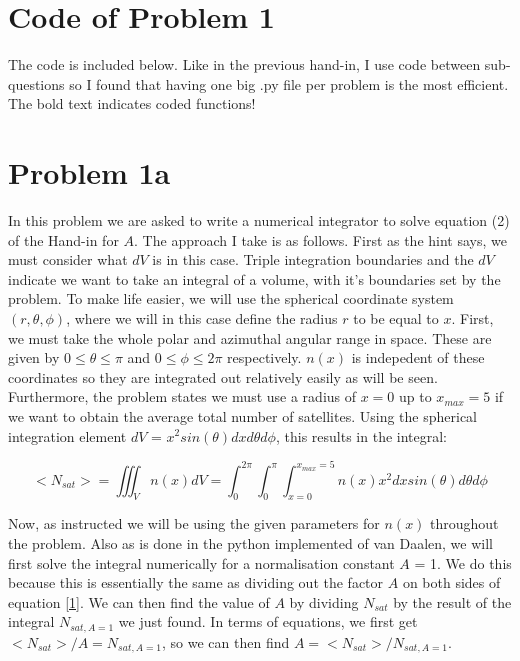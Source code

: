 \section*{Code of Problem 1}

The code is included below. Like in the previous hand-in, I use code between sub-questions so I found that having one big .py file per problem is the most efficient. The bold text indicates coded functions! 



\section*{Problem 1a}

In this problem we are asked to write a numerical integrator to solve equation (2) of the Hand-in for $A$. The approach I take is as follows. First as the hint says, we must consider what $dV$ is in this case. Triple integration boundaries and the $dV$ indicate we want to take an integral of a volume, with it's boundaries set by the problem. To make life easier, we will use the spherical coordinate system $(r,\theta,\phi)$, where we will in this case define the radius $r$ to be equal to $x$. First, we must take the whole polar and azimuthal angular range in space. These are given by $0 \le \theta \le \pi$ and $0 \le \phi \le 2\pi$ respectively. $n(x)$ is indepedent of these coordinates so they are integrated out relatively easily as will be seen. Furthermore, the problem states we must use a radius of $x = 0$ up to $x_{max} = 5$ if we want to obtain the average total number of satellites. Using the spherical integration element $dV$ = $x^2 sin(\theta)dxd\theta d\phi$, this results in the integral:

\begin{equation}	
	<N_{sat}> = \iiint_{V} n(x)dV = \int_0^{2\pi} \int_0^{\pi} \int_{x=0}^{x_{max}=5} n(x) x^2 dx sin(\theta)d\theta d\phi
	\label{1}
\end{equation}

Now, as instructed we will be using the given parameters for $n(x)$ throughout the problem. Also as is done in the python implemented of van Daalen, we will first solve the integral numerically for a normalisation constant $A$ = 1. We do this because this is essentially the same as dividing out the factor $A$ on both sides of equation \ref{1}. We can then find the value of $A$ by dividing $N_{sat}$ by the result of the integral $N_{sat,A=1}$ we just found. In terms of equations, we first get $<N_{sat}>/A = N_{sat,A=1}$, so we can then find $A =<N_{sat}>/ N_{sat,A=1}$.\\

